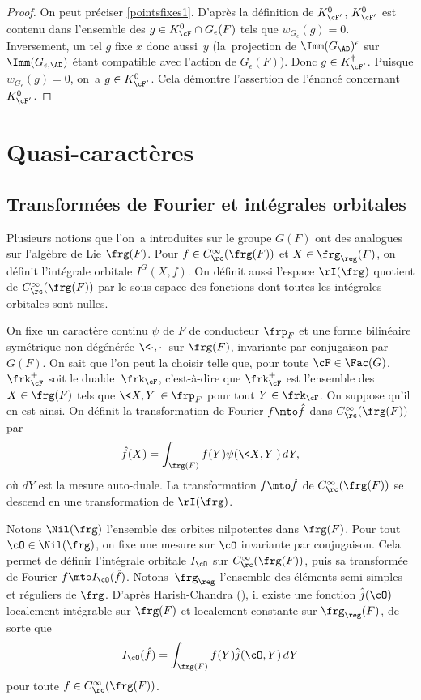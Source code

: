 \begin{proof}
On peut préciser \eqref{pointsfixes1}. D'après la définition de $K_{\cF'}^0$, $K_{\cF'}^0$ est contenu dans l'ensemble des $g\in K_{\cF}^0\cap G_{\epsilon}(F) $ tels que $w_{G_{\epsilon}}(g)=0$. Inversement, un tel $g$ fixe $x$ donc aussi~$y$ (la~projection de $\Imm(G_{\AD})^{\epsilon}$ sur $\Imm(G_{\epsilon,\AD})$ étant compatible avec l'action de $G_{\epsilon}(F)$). Donc $g\in K_{\cF'}^{\dag}$. Puisque $w_{G_{\epsilon}}(g)=0$, on~a $g\in K_{\cF'}^0$. Cela démontre l'assertion de l'énoncé concernant $K_{\cF'}^0$.
\end{proof}

\section{Quasi-caractères}
\subsection{Transformées de Fourier et intégrales orbitales}\label{transformees}
Plusieurs notions que l'on~a introduites sur le groupe $G(F)$ ont des analogues sur l'algèbre de Lie $\frg(F)$. Pour $f\in C_{\rc}^{\infty}(\frg(F))$ et $X\in \frg_{\reg}(F)$, on définit l'intégrale orbitale $I^G(X,f)$. On définit aussi l'espace $\rI(\frg)$ quotient de $C_{\rc}^{\infty}(\frg(F))$ par le sous-espace des fonctions dont toutes les intégrales orbitales sont nulles.

On fixe un caractère continu $\psi$ de $F$ de conducteur $\frp_{F}$ et une forme bilinéaire symétrique non dégénérée $\<{\cdot},{\cdot}\>$ sur $\frg(F)$, invariante par conjugaison par $G(F)$. On sait que l'on peut la choisir telle que, pour toute $\cF\in \Fac(G)$, $\frk_{\cF}^+$ soit le \og dual\fg de~$\frk_{\cF}$, c'est-à-dire que $\frk_{\cF}^+$ est l'ensemble des $X\in \frg(F)$ tels que $\<X,Y\>\in \frp_{F}$ pour tout $Y\in \frk_{\cF}$. On suppose qu'il en est ainsi. On définit la transformation de Fourier $f\mto \hat{f}$ dans $C_{\rc}^{\infty}(\frg(F))$ par
\[
\hat{f}(X)=\int_{\frg(F)}f(Y)\psi(\<X,Y\>)\,dY,
\]
où $dY$ est la mesure auto-duale. La transformation $f\mto \hat{f}$ de $C_{\rc}^{\infty}(\frg(F))$ se descend en une transformation de $\rI(\frg)$.

Notons $\Nil(\frg)$ l'ensemble des orbites nilpotentes dans $\frg(F)$. Pour tout $\cO\in \Nil(\frg)$, on fixe une mesure sur $\cO$ invariante par conjugaison. Cela permet de définir l'inté\-grale orbitale $I_{\cO}$ sur $C_{\rc}^{\infty}(\frg(F))$, puis sa transformée de Fourier $f\mto I_{\cO}(\hat{f})$. \hbox{Notons}~$\frg_{\reg}$ l'ensemble des éléments semi-simples et réguliers de $\frg$. D'après Harish-Chandra (\hbox{\cite[Th.\,4.4]{HC}}), il existe une fonction $\hat{j}(\cO)$ localement intégrable sur $\frg(F)$ et localement constante sur $\frg_{\reg}(F)$, de sorte que
\[
I_{\cO}(\hat{f})=\int_{\frg(F)}f(Y)\hat{j}(\cO,Y)\,dY
\]
pour toute $f\in C_{\rc}^{\infty}(\frg(F))$.

